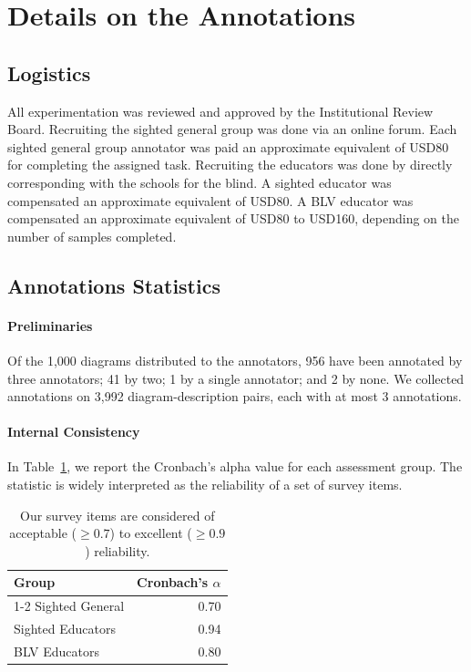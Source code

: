 \section{Details on the Annotations}\label{app:ann_detail}

\subsection{Logistics}

All experimentation was reviewed and approved by the Institutional Review Board. Recruiting the sighted general group was done via an online forum. Each sighted general group annotator was paid an approximate equivalent of USD80 for completing the assigned task. Recruiting the educators was done by directly corresponding with the schools for the blind. A sighted educator was compensated an approximate equivalent of USD80. A BLV educator was compensated an approximate equivalent of USD80 to USD160, depending on the number of samples completed.

\subsection{Annotations Statistics}
\paragraph{Preliminaries}

Of the 1,000 diagrams distributed to the annotators, 956 have been annotated by three annotators; 41 by two; 1 by a single annotator; and 2 by none. We collected annotations on 3,992 diagram-description pairs, each with at most 3 annotations.


\paragraph{Internal Consistency}

In Table~\ref{tab:cronbach}, we report the Cronbach's alpha value for each assessment group. The statistic is widely interpreted as the reliability of a set of survey items.

\begin{table}[h!]
\centering

\begin{tabular}{lr}
\toprule
\textbf{Group}                   & \textbf{Cronbach's $\alpha$} \\ \cmidrule{1-2}
Sighted General         & 0.70 \\
Sighted Educators       & 0.94 \\
BLV Educators           & 0.80 \\

\bottomrule
\end{tabular}
\caption{Our survey items are considered of acceptable ($\ge0.7$) to excellent ($\ge0.9$) reliability.}
\label{tab:cronbach}
\end{table}


